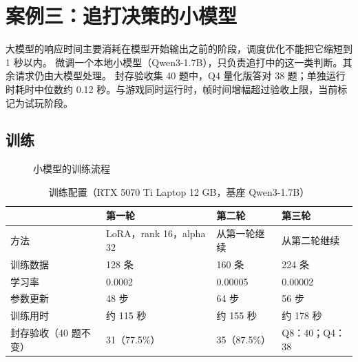 \documentclass[11pt]{article}
\begin{document}
\section{案例三：追打决策的小模型}

{大模型的响应时间主要消耗在模型开始输出之前的阶段，调度优化不能把它缩短到 1 秒以内。}
{微调一个本地小模型（Qwen3-1.7B），只负责追打中的这一类判断。其余请求仍由大模型处理。}
{封存验收集 40 题中，Q4 量化版答对 38 题；单独运行时耗时中位数约 0.12 秒。与游戏同时运行时，帧时间增幅超过验收上限，当前标记为试玩阶段。}

\subsection{训练}

\begin{figure}[H]
\centering
{}
\caption{小模型的训练流程}
\end{figure}

\begin{table}[H]
\small
\begin{tabularx}{\textwidth}{@{}l L L L@{}}
\toprule
 & \textbf{第一轮} & \textbf{第二轮} & \textbf{第三轮} \\
\midrule
方法 & LoRA，rank 16，alpha 32 & 从第一轮继续 & 从第二轮继续 \\
训练数据 & 128 条 & 160 条 & 224 条 \\
学习率 & 0.0002 & 0.00005 & 0.00002 \\
参数更新 & 48 步 & 64 步 & 56 步 \\
训练用时 & 约 115 秒 & 约 155 秒 & 约 178 秒 \\
封存验收（40 题不变） & 31（77.5\%） & 35（87.5\%） & Q8：40；Q4：38 \\
\bottomrule
\end{tabularx}
\caption{训练配置（RTX 5070 Ti Laptop 12 GB，基座 Qwen3-1.7B）}
\end{table}
\end{document}
